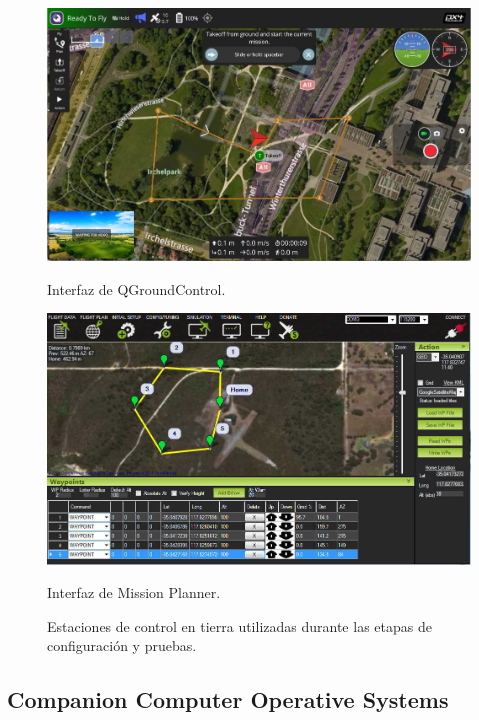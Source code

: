     \begin{figure}[h!]
        \centering
        \begin{minipage}{0.48\textwidth}
            \centering
            \includegraphics[width=\textwidth]{pictures/qgc_interface.jpg} %
            \caption{Interfaz de QGroundControl.}
            \label{fig:qgc}
        \end{minipage}
        \hfill
        \begin{minipage}{0.48\textwidth}
            \centering
            \includegraphics[width=\textwidth]{pictures/mission_planner.jpg} %
            \caption{Interfaz de Mission Planner.}
            \label{fig:mission_planner}
        \end{minipage}
        \caption{Estaciones de control en tierra utilizadas durante las etapas de configuración y pruebas.}
        \label{fig:gcs}
    \end{figure}


\subsection{Companion Computer Operative Systems} 
    
